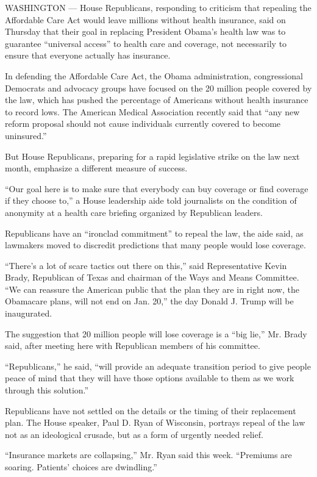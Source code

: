 WASHINGTON --- House Republicans, responding to criticism that repealing
the Affordable Care Act would leave millions without health insurance,
said on Thursday that their goal in replacing President Obama's health
law was to guarantee ``universal access'' to health care and coverage,
not necessarily to ensure that everyone actually has insurance.

In defending the Affordable Care Act, the Obama administration,
congressional Democrats and advocacy groups have focused on the 20
million people covered by the law, which has pushed the percentage of
Americans without health insurance to record lows. The American Medical
Association recently said that ``any new reform proposal should not
cause individuals currently covered to become uninsured.''

But House Republicans, preparing for a rapid legislative strike on the
law next month, emphasize a different measure of success.

``Our goal here is to make sure that everybody can buy coverage or find
coverage if they choose to,'' a House leadership aide told journalists
on the condition of anonymity at a health care briefing organized by
Republican leaders.

Republicans have an ``ironclad commitment'' to repeal the law, the aide
said, as lawmakers moved to discredit predictions that many people would
lose coverage.

``There's a lot of scare tactics out there on this,'' said
Representative Kevin Brady, Republican of Texas and chairman of the Ways
and Means Committee. ``We can reassure the American public that the plan
they are in right now, the Obamacare plans, will not end on Jan. 20,''
the day Donald J. Trump will be inaugurated.

The suggestion that 20 million people will lose coverage is a ``big
lie,'' Mr. Brady said, after meeting here with Republican members of his
committee.

``Republicans,'' he said, ``will provide an adequate transition period
to give people peace of mind that they will have those options available
to them as we work through this solution.''

Republicans have not settled on the details or the timing of their
replacement plan. The House speaker, Paul D. Ryan of Wisconsin, portrays
repeal of the law not as an ideological crusade, but as a form of
urgently needed relief.

``Insurance markets are collapsing,'' Mr. Ryan said this week.
``Premiums are soaring. Patients' choices are dwindling.''

